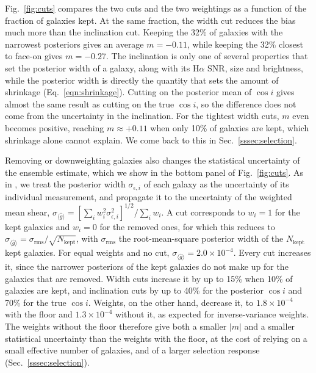 Fig.~\ref{fig:cuts} compares the two cuts and the two weightings as a function of the fraction of galaxies kept. At the same fraction, the width cut reduces the bias much more than the inclination cut. Keeping the 32\% of galaxies with the narrowest posteriors gives an average $m = -0.11$, while keeping the 32\% closest to face-on gives $m = -0.27$. The inclination is only one of several properties that set the posterior width of a galaxy, along with its H$\alpha$ SNR, size and brightness, while the posterior width is directly the quantity that sets the amount of shrinkage (Eq.~\ref{eqn:shrinkage}). Cutting on the posterior mean of $\cos i$ gives almost the same result as cutting on the true $\cos i$, so the difference does not come from the uncertainty in the inclination. For the tightest width cuts, $m$ even becomes positive, reaching $m \approx +0.11$ when only 10\% of galaxies are kept, which shrinkage alone cannot explain. We come back to this in Sec.~\ref{sssec:selection}.

Removing or downweighting galaxies also changes the statistical uncertainty of the ensemble estimate, which we show in the bottom panel of Fig.~\ref{fig:cuts}. As in \citep{KLInferenceI}, we treat the posterior width $\sigma_{\epsilon,i}$ of each galaxy as the uncertainty of its individual measurement, and propagate it to the uncertainty of the weighted mean shear, $\sigma_{\langle\hat{g}\rangle} = [\sum_i w_i^2 \sigma_{\epsilon,i}^2]^{1/2}/\sum_i w_i$. A cut corresponds to $w_i = 1$ for the kept galaxies and $w_i = 0$ for the removed ones, for which this reduces to $\sigma_{\langle\hat{g}\rangle} = \sigma_\mathrm{rms}/\sqrt{N_\mathrm{kept}}$, with $\sigma_\mathrm{rms}$ the root-mean-square posterior width of the $N_\mathrm{kept}$ kept galaxies. For equal weights and no cut, $\sigma_{\langle\hat{g}\rangle} = 2.0\times10^{-4}$. Every cut increases it, since the narrower posteriors of the kept galaxies do not make up for the galaxies that are removed. Width cuts increase it by up to 15\% when 10\% of galaxies are kept, and inclination cuts by up to 40\% for the posterior $\cos i$ and 70\% for the true $\cos i$. Weights, on the other hand, decrease it, to $1.8\times10^{-4}$ with the floor and $1.3\times10^{-4}$ without it, as expected for inverse-variance weights. The weights without the floor therefore give both a smaller $|m|$ and a smaller statistical uncertainty than the weights with the floor, at the cost of relying on a small effective number of galaxies, and of a larger selection response (Sec.~\ref{sssec:selection}).

